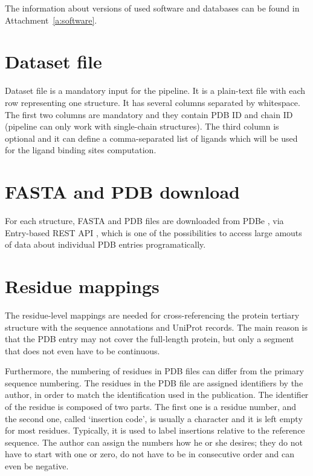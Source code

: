 The information about versions of used software and databases can be found in Attachment~\ref{a:software}.


\section{Dataset file}
Dataset file is a mandatory input for the pipeline. It is a plain-text file with each row representing one structure. It has several columns separated by whitespace. The first two columns are mandatory and they contain PDB ID and chain ID (pipeline can only work with single-chain structures). The third column is optional and it can define a comma-separated list of ligands which will be used for the ligand binding sites computation.

\section{FASTA and PDB download}

For each structure, FASTA and PDB files are downloaded from PDBe \cite{pdbe}, via Entry-based REST API \cite{pdbe_restapi}, which is one of the possibilities to access large amouts of data about individual PDB entries programatically.

\section{Residue mappings} \label{s:mappings}

The residue-level mappings are needed for cross-referencing the protein tertiary structure with the sequence annotations and UniProt \cite{uniprot} records. The main reason is that the PDB entry may not cover the full-length protein, but only a segment that does not even have to be continuous.

Furthermore, the numbering of residues in PDB files can differ from the primary sequence numbering. The residues in the PDB file are assigned identifiers by the author, in order to match the identification used in the publication. The identifier of the residue is composed of two parts. The first one is a residue number, and the second one, called `insertion code', is usually a character and it is left empty for most residues. Typically, it is used to label insertions relative to the reference sequence. The author can assign the numbers how he or she desires; they do not have to start with one or zero, do not have to be in consecutive order and can even be negative.

